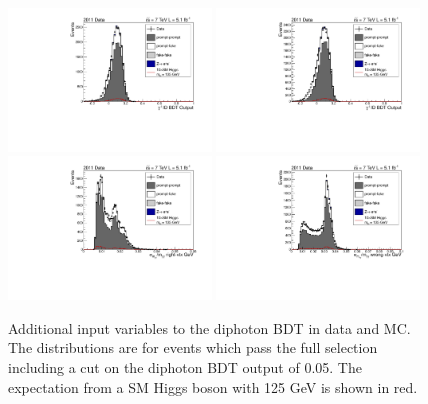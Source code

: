 \begin{figure}[hbt!]
  \includegraphics[width=0.48\textwidth]{hgg7TeV/variablePlots/phoid_1}
  \includegraphics[width=0.48\textwidth]{hgg7TeV/variablePlots/phoid_2}\\
  \includegraphics[width=0.48\textwidth]{hgg7TeV/variablePlots/sigmrv}
  \includegraphics[width=0.48\textwidth]{hgg7TeV/variablePlots/sigmwv}
 \caption{Additional input variables to the diphoton BDT in data and MC. 
	  The distributions are for events which pass the full selection 
	  including a cut on the diphoton BDT output of 0.05.
 	  The expectation from a SM Higgs boson with 125 GeV is shown in red.}
 \label{fig:diphotonbdtvars2}
\end{figure}


